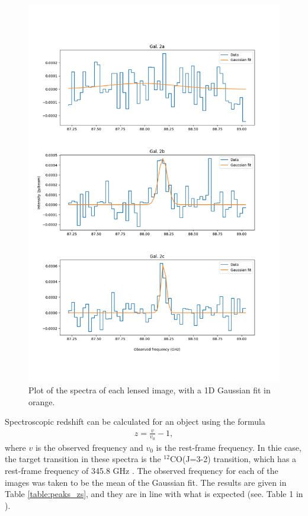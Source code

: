 \documentclass[11pt]{article}
\begin{document}
\begin{figure}[!htbp]
    \centering
    \includegraphics[width=0.8\linewidth]{../figs/gaussian_fit.png}
	\caption{Plot of the spectra of each lensed image, with a 1D Gaussian fit in orange.} 
    \label{fig:gaussian_fit}
\end{figure}

Spectroscopic redshift can be calculated for an object using the formula 
\begin{align}\label{eqn:redshift}
	z = \frac{v}{v_0} - 1,
\end{align}
where $v$ is the observed frequency and $v_0$ is the rest-frame frequency. In thie case, the target transition in these spectra is the $^{12}$CO(J=3-2) transition, which has a rest-frame frequency of 345.8 GHz \citep{Carilli2013}. The observed frequency for each of the images was taken to be the mean of the Gaussian fit. The results are given in Table \ref{table:peaks_zs}, and they are in line with what is expected (see. Table 1 in \cite{MacKenzie2014}).
\end{document}
